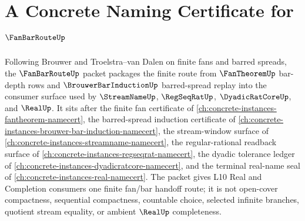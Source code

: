 \chapter{A Concrete Naming Certificate for $\FanBarRouteUp$}
\label{ch:concrete-instances-fan-bar-route-namecert}

Following Brouwer and Troelstra--van Dalen on finite fans and barred spreads, the $\FanBarRouteUp$ packet packages the finite route from $\FanTheoremUp$ bar-depth rows and $\BrouwerBarInductionUp$ barred-spread replay into the consumer surface used by $\StreamNameUp$, $\RegSeqRatUp$, $\DyadicRatCoreUp$, and $\RealUp$. It sits after the finite fan certificate of \autoref{ch:concrete-instances-fantheorem-namecert}, the barred-spread induction certificate of \autoref{ch:concrete-instances-brouwer-bar-induction-namecert}, the stream-window surface of \autoref{ch:concrete-instances-streamname-namecert}, the regular-rational readback surface of \autoref{ch:concrete-instances-regseqrat-namecert}, the dyadic tolerance ledger of \autoref{ch:concrete-instances-dyadicratcore-namecert}, and the terminal real-name seal of \autoref{ch:concrete-instances-real-namecert}. The packet gives L10 Real and Completion consumers one finite fan/bar handoff route; it is not open-cover compactness, sequential compactness, countable choice, selected infinite branches, quotient stream equality, or ambient $\RealUp$ completeness.

